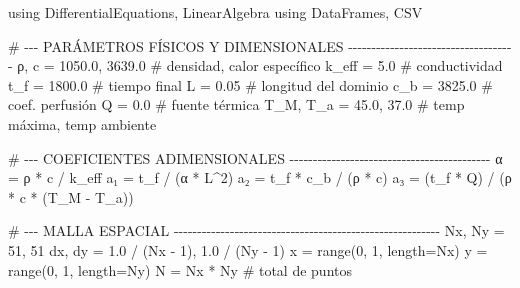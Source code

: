 \documentclass[
  spanish,
  us-letterpaper,
  DIV=11,
  numbers=noendperiod]{scrreprt}
\newenvironment{Shaded}{\begin{snugshade}}{\end{snugshade}}
\newcommand{\BuiltInTok}[1]{\textcolor[rgb]{0.00,0.23,0.31}{#1}}
\newcommand{\CommentTok}[1]{\textcolor[rgb]{0.37,0.37,0.37}{#1}}
\newcommand{\FloatTok}[1]{\textcolor[rgb]{0.68,0.00,0.00}{#1}}
\newcommand{\FunctionTok}[1]{\textcolor[rgb]{0.28,0.35,0.67}{#1}}
\newcommand{\ImportTok}[1]{\textcolor[rgb]{0.00,0.46,0.62}{#1}}
\newcommand{\NormalTok}[1]{\textcolor[rgb]{0.00,0.23,0.31}{#1}}
\newcommand{\OperatorTok}[1]{\textcolor[rgb]{0.37,0.37,0.37}{#1}}
\theoremstyle{definition}
\theoremstyle{plain}
\theoremstyle{remark}
\begin{document}
\begin{Shaded}
\begin{Highlighting}[]
\ImportTok{using} \BuiltInTok{DifferentialEquations}\NormalTok{, }\BuiltInTok{LinearAlgebra}
\ImportTok{using} \BuiltInTok{DataFrames}\NormalTok{, }\BuiltInTok{CSV}

\CommentTok{\# {-}{-}{-} PARÁMETROS FÍSICOS Y DIMENSIONALES {-}{-}{-}{-}{-}{-}{-}{-}{-}{-}{-}{-}{-}{-}{-}{-}{-}{-}{-}{-}{-}{-}{-}{-}{-}{-}{-}{-}{-}{-}{-}{-}{-}{-}{-}{-}}
\NormalTok{ρ, c  }\OperatorTok{=} \FloatTok{1050.0}\NormalTok{, }\FloatTok{3639.0}                        \CommentTok{\# densidad, calor específico }
\NormalTok{k\_eff }\OperatorTok{=} \FloatTok{5.0}                                   \CommentTok{\# conductividad}
\NormalTok{t\_f   }\OperatorTok{=} \FloatTok{1800.0}                                \CommentTok{\# tiempo final }
\NormalTok{L     }\OperatorTok{=} \FloatTok{0.05}                                  \CommentTok{\# longitud del dominio}
\NormalTok{c\_b   }\OperatorTok{=} \FloatTok{3825.0}                                \CommentTok{\# coef. perfusión}
\NormalTok{Q     }\OperatorTok{=} \FloatTok{0.0}                                   \CommentTok{\# fuente térmica}
\NormalTok{T\_M, T\_a }\OperatorTok{=} \FloatTok{45.0}\NormalTok{, }\FloatTok{37.0}                         \CommentTok{\# temp máxima, temp ambiente}

\CommentTok{\# {-}{-}{-} COEFICIENTES ADIMENSIONALES {-}{-}{-}{-}{-}{-}{-}{-}{-}{-}{-}{-}{-}{-}{-}{-}{-}{-}{-}{-}{-}{-}{-}{-}{-}{-}{-}{-}{-}{-}{-}{-}{-}{-}{-}{-}{-}{-}{-}{-}{-}{-}{-}}
\NormalTok{α }\OperatorTok{=}\NormalTok{ ρ }\OperatorTok{*}\NormalTok{ c }\OperatorTok{/}\NormalTok{ k\_eff}
\NormalTok{a₁ }\OperatorTok{=}\NormalTok{ t\_f }\OperatorTok{/}\NormalTok{ (α }\OperatorTok{*}\NormalTok{ L}\OperatorTok{\^{}}\FloatTok{2}\NormalTok{)}
\NormalTok{a₂ }\OperatorTok{=}\NormalTok{ t\_f }\OperatorTok{*}\NormalTok{ c\_b }\OperatorTok{/}\NormalTok{ (ρ }\OperatorTok{*}\NormalTok{ c)}
\NormalTok{a₃ }\OperatorTok{=}\NormalTok{ (t\_f }\OperatorTok{*}\NormalTok{ Q) }\OperatorTok{/}\NormalTok{ (ρ }\OperatorTok{*}\NormalTok{ c }\OperatorTok{*}\NormalTok{ (T\_M }\OperatorTok{{-}}\NormalTok{ T\_a))}

\CommentTok{\# {-}{-}{-} MALLA ESPACIAL {-}{-}{-}{-}{-}{-}{-}{-}{-}{-}{-}{-}{-}{-}{-}{-}{-}{-}{-}{-}{-}{-}{-}{-}{-}{-}{-}{-}{-}{-}{-}{-}{-}{-}{-}{-}{-}{-}{-}{-}{-}{-}{-}{-}{-}{-}{-}{-}{-}{-}{-}{-}{-}{-}{-}{-}{-}}
\NormalTok{Nx, Ny }\OperatorTok{=} \FloatTok{51}\NormalTok{, }\FloatTok{51}
\NormalTok{dx, dy }\OperatorTok{=} \FloatTok{1.0} \OperatorTok{/}\NormalTok{ (Nx }\OperatorTok{{-}} \FloatTok{1}\NormalTok{), }\FloatTok{1.0} \OperatorTok{/}\NormalTok{ (Ny }\OperatorTok{{-}} \FloatTok{1}\NormalTok{)}
\NormalTok{x }\OperatorTok{=} \FunctionTok{range}\NormalTok{(}\FloatTok{0}\NormalTok{, }\FloatTok{1}\NormalTok{, length}\OperatorTok{=}\NormalTok{Nx)}
\NormalTok{y }\OperatorTok{=} \FunctionTok{range}\NormalTok{(}\FloatTok{0}\NormalTok{, }\FloatTok{1}\NormalTok{, length}\OperatorTok{=}\NormalTok{Ny)}
\NormalTok{N }\OperatorTok{=}\NormalTok{ Nx }\OperatorTok{*}\NormalTok{ Ny  }\CommentTok{\# total de puntos}


\end{Highlighting}
\end{Shaded}
\end{document}
